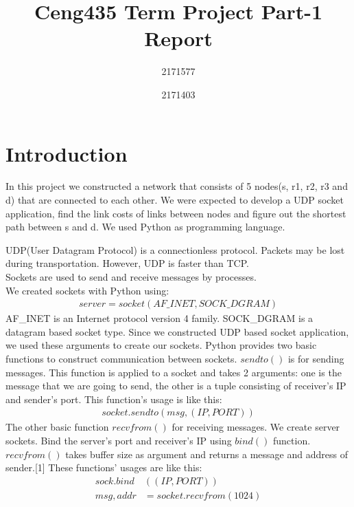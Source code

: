 \documentclass[conference]{IEEEtran}
\begin{document}
\title{Ceng435 Term Project Part-1 Report\\
}

\author{
2171577 \\ 
\and
{}
2171403
}

\maketitle


\section{Introduction}
In this project we constructed a network that consists of 5 nodes(s, r1, r2, r3 and d) that are connected to each other. We were expected to develop a UDP socket application, find the link costs of links between nodes and figure out the shortest path between s and d. We used Python as programming language. 

UDP(User Datagram Protocol) is a connectionless protocol. Packets may be lost during transportation. However, UDP is faster than TCP.  \\
Sockets are used to send and receive messages by processes.\\
We created sockets with Python using:
\begin{align*}
    server = socket(AF\_INET, SOCK\_DGRAM)
\end{align*}
AF\_INET is an Internet protocol version 4 family. SOCK\_DGRAM is a datagram based socket type. Since we constructed UDP based socket application, we used these arguments to create our sockets. Python provides two basic functions to construct communication between sockets. $sendto()$ is for sending messages. This function is applied to a socket and takes 2 arguments: one is the message that we are going to send, the other is a tuple consisting of receiver's IP and sender's port. This function's usage is like this:
\begin{align*}
    socket.sendto(msg,(IP, PORT))
\end{align*}
The other basic function $recvfrom()$ for receiving messages. We create server sockets. Bind the server's port and receiver's IP using $bind()$ function. $recvfrom()$ takes buffer size as argument and returns a message and address of sender.[1] These functions' usages are like this:
\begin{align*}
    sock.bind&((IP, PORT)) \\
    msg, addr &= socket.recvfrom(1024)
\end{align*}
\end{document}
